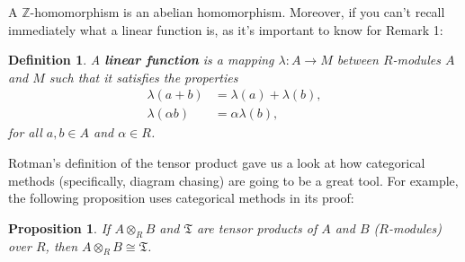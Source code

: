 \documentclass[12pt,reqno]{amsart}
\theoremstyle{plain}
\newtheorem{defi}{Definition}
\newtheorem{prop}{Proposition}
\newcommand{\zz}{\mathbb Z}
\begin{document}
A $\zz$-homomorphism is an abelian homomorphism. Moreover, if you can't recall immediately what a linear function is, as it's important to know for Remark 1:
\begin{defi} A \textbf{linear function} is a mapping $\lambda \colon A \to M$ between $R$-modules $A$ and $M$ such that it satisfies the properties
\begin{align*}
\lambda (a+b) &= \lambda (a) + \lambda (b), \\
\lambda (\alpha b) &= \alpha \lambda (b),
\end{align*}
for all $a, b \in A$ and $\alpha \in R$.
\end{defi} 
Rotman's definition of the tensor product gave us a look at how categorical methods (specifically, diagram chasing) are going to be a great tool. For example, the following proposition uses categorical methods in its proof:
\begin{prop} If $A \otimes_R B$ and $\mathfrak{T}$ are tensor products of $A$ and $B$ ($R$-modules) over $R$, then $A \otimes_R B \cong \mathfrak{T}$.
\end{prop} 
\end{document}
